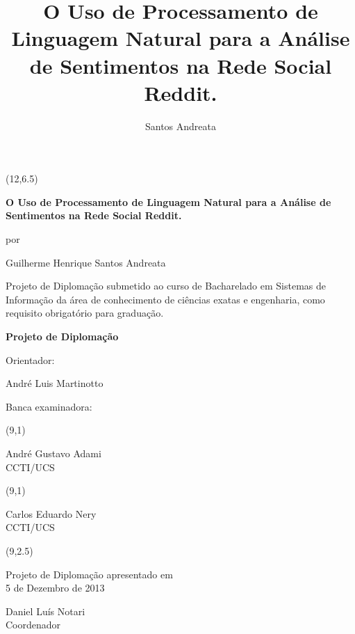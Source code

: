 \documentclass{iiufrgs}
\title{O Uso de Processamento de Linguagem Natural para a Análise de
Sentimentos na Rede Social Reddit.}
\author{Santos Andreata}{Guilherme Henrique}
\begin{document}
\maketitle  

\begin{titlepage}
\vfill

\begin{center}
{\setlength{\unitlength}{1cm}\makebox(12,6.5){\parbox[c]{12cm}{\setlength{\parskip}{0.8cm}\center\vskip -1.2cm\LARGE{\bf O Uso de Processamento de Linguagem Natural para a Análise de Sentimentos na
Rede Social Reddit.}\par \normalsize por\par \large Guilherme Henrique
Santos Andreata\par}}}
\end{center}

{\large Projeto de Diplomação submetido ao curso de Bacharelado em Sistemas de
Informação da área de conhecimento de ciências exatas e engenharia, como requisito obrigatório para graduação.}

\vfill

\begin{center}
{\Large\bf Projeto de Diplomação}
\end{center}

\vfill

\begin{singlespace}
Orientador: {André Luis Martinotto\par}

Banca examinadora:\par
\hspace{1cm} {\setlength{\unitlength}{1cm}
\makebox(9,1){\parbox[c]{9cm}{\center André Gustavo Adami\\ CCTI/UCS}}}\par
\hspace{1cm} {\setlength{\unitlength}{1cm}
\makebox(9,1){\parbox[c]{9cm}{\center Carlos Eduardo Nery\\ CCTI/UCS}}}\par

\vfill

\hfill{\setlength{\unitlength}{1cm}\makebox(9,2.5){\parbox[c]{9cm}{\setlength{\parskip}{0.8cm}\center\vskip -1.2cm Projeto de Diplomação apresentado em\\ 5 de Dezembro de 2013\par Daniel Luís Notari\\ Coordenador}}}

\end{singlespace}

\end{titlepage}
\end{document}
